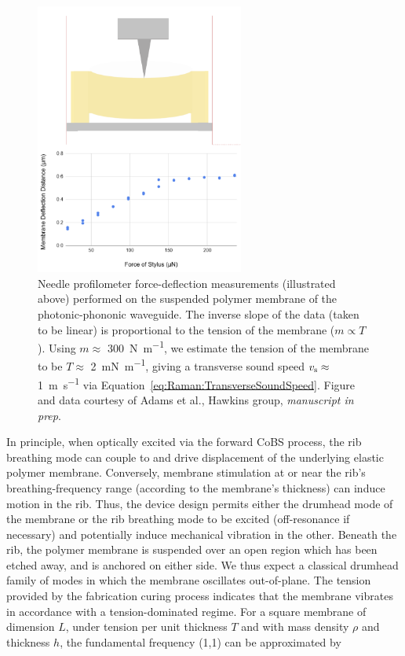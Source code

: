 \begin{figure}[t]
  \centering
  \includegraphics[width=0.61\textwidth]{figs/4-Raman/profilometer.png}
  \caption[Needle profilometer force-deflection measurements performed on the suspended polymer membrane of the photonic-phononic waveguide.]{Needle profilometer force-deflection measurements (illustrated above) performed on the suspended polymer membrane of the photonic-phononic waveguide. The inverse slope of the data (taken to be linear) is proportional to the tension of the membrane (\(m\propto T\)). Using \(m \approx\) \SI{300}{\newton\per\meter}, we estimate the tension of the membrane to be \(T \approx\) \SI{2}{\milli\newton\per\meter}, giving a transverse sound speed \(v_{\rm s} \approx\) \SI{1}{\meter\per\second} via Equation~\ref{eq:Raman:TransverseSoundSpeed}. Figure and data courtesy of Adams et al., Hawkins group, \textit{manuscript in prep}.}
  \label{fig:Raman:profilometer}
\end{figure}

In principle, when optically excited via the forward \ac{CoBS} process, the rib breathing mode can couple to and drive displacement of the underlying elastic polymer membrane. Conversely, membrane stimulation at or near the rib’s breathing-frequency range (according to the membrane's thickness) can induce motion in the rib. Thus, the device design permits either the drumhead mode of the membrane or the rib breathing mode to be excited (off-resonance if necessary) and potentially induce mechanical vibration in the other. Beneath the rib, the polymer membrane is suspended over an open region which has been etched away, and is anchored on either side. We thus expect a classical drumhead family of modes in which the membrane oscillates out-of-plane. The tension provided by the fabrication curing process indicates that the membrane vibrates in accordance with a tension-dominated regime. For a square membrane of dimension \(L\), under tension per unit thickness \(T\) and with mass density \(\rho\) and thickness \(h\), the fundamental frequency (1,1) can be approximated by

